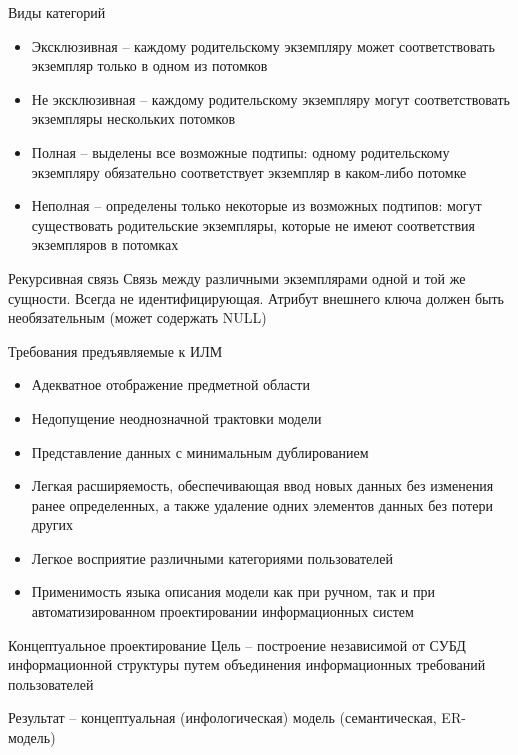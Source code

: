 \documentclass[12pt]{article}
\begin{document}
\begin{nota}{Виды категорий}
    \begin{itemize}
        \item Эксклюзивная -- каждому родительскому экземпляру может соответствовать экземпляр только в одном из потомков 
        \item Не эксклюзивная -- каждому родительскому экземпляру могут соответствовать экземпляры нескольких потомков 
        \item Полная -- выделены все возможные подтипы: одному родительскому экземпляру обязательно соответствует экземпляр в каком-либо потомке 
        \item Неполная -- определены только некоторые из возможных подтипов: могут существовать родительские экземпляры, которые не имеют соответствия экземпляров в потомках 
    \end{itemize}
\end{nota}

\begin{defin}{Рекурсивная связь}
    Связь между различными экземплярами одной и той же сущности. Всегда не идентифицирующая. Атрибут внешнего ключа должен быть необязательным (может содержать NULL)
\end{defin}

\begin{Remark}{Требования предъявляемые к ИЛМ}
    \begin{itemize}
        \item Адекватное отображение предметной области 
        \item Недопущение неоднозначной трактовки модели 
        \item Представление данных с минимальным дублированием 
        \item Легкая расширяемость, обеспечивающая ввод новых данных без изменения ранее определенных, а также удаление одних элементов данных без потери других 
        \item Легкое восприятие различными категориями пользователей 
        \item Применимость языка описания модели как при ручном, так и при автоматизированном проектировании информационных систем 
    \end{itemize}
\end{Remark}

\begin{defin}{Концептуальное проектирование}
    Цель -- построение независимой от СУБД информационной структуры путем объединения информационных требований пользователей 

    Результат -- концептуальная (инфологическая) модель (семантическая, ER-модель)
\end{defin}
\end{document}
